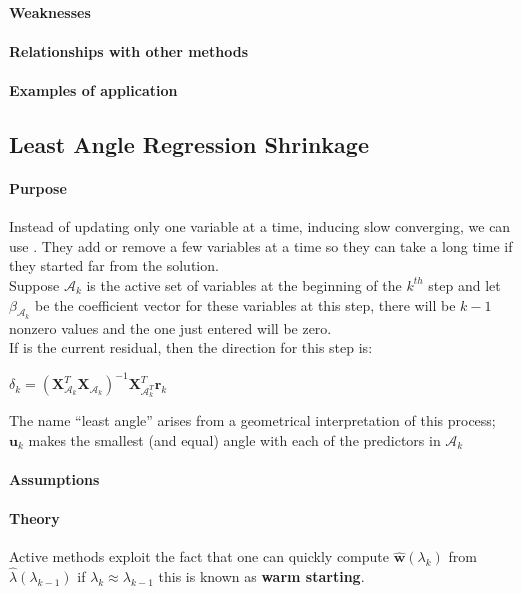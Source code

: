 \paragraph{Weaknesses}
\paragraph{Relationships with other methods}
\paragraph{Examples of application}


\subsection{Least Angle Regression Shrinkage}
\paragraph{Purpose}
Instead of updating only one variable at a time, inducing slow converging, we can use . They add or remove a few variables at
a time so they can take a long time if they started far from the solution.\\
Suppose $\mathcal{A}_{k}$ is the active set of variables at the 
beginning of the $k^{th}$ step and let $\beta_{\mathcal{A}_{k}}$ be the
coefficient vector for these variables at this step, there will be 
$k-1$ nonzero values and the one just entered will be zero.\\
If 
is the current residual, then the direction for this step is:
\begin{center}
    $\delta_{k}=(\bm{X}_{\mathcal{A}_{k}}^{T}\bm{X}_{\mathcal{A}_{k}})^{-1}\bm{X}_{\mathcal{A}_{k}^{T}}^{T}\bm{r}_{k}$
\end{center}
The name ``least angle'' arises from a geometrical interpretation of 
this process; $\bm{u}_{k}$ makes the smallest (and equal) angle with
each of the predictors in $\mathcal{A}_{k}$
\paragraph{Assumptions}
\paragraph{Theory}
Active methods exploit the fact that one can quickly compute $\hat{\bm{w}}(\lambda_{k})$ from 
$\hat{\lambda}(\lambda_{k-1})$ if $\lambda_{k}\approx\lambda_{k-1}$ this is known as \textbf{warm
starting}.

